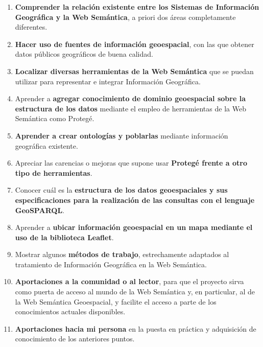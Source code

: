 \begin{enumerate}
	
	\item \textbf{Comprender la relación existente entre los Sistemas de Información Geográfica y la Web Semántica}, a priori dos áreas completamente diferentes.
	
	\item \textbf{Hacer uso de fuentes de información geoespacial}, con las que obtener datos públicos geográficos de buena calidad.
	
	\item \textbf{Localizar diversas herramientas de la Web Semántica} que se puedan utilizar para representar e integrar Información Geográfica.
	
	\item Aprender a \textbf{agregar conocimiento de dominio geoespacial sobre la estructura de los datos} mediante el empleo de herramientas de la Web Semántica como Protegé.
		
	\item \textbf{Aprender a crear ontologías y poblarlas}  mediante información geográfica existente.
	
	\item Apreciar las carencias o mejoras que supone usar \textbf{Protegé frente a otro tipo de herramientas}.
	
	\item Conocer cuál es la \textbf{estructura de los datos geoespaciales y sus especificaciones para la realización de las consultas con el lenguaje GeoSPARQL}.
	
	\item Aprender a \textbf{ubicar información geoespacial en un mapa mediante el uso de la biblioteca Leaflet}.
	
	\item Mostrar algunos \textbf{métodos de trabajo}, estrechamente adaptados al tratamiento de Información Geográfica en la Web Semántica.
	
	\item \textbf{Aportaciones a la comunidad o al lector}, para que el proyecto sirva como puerta de acceso al mundo de la Web Semántica y, en particular, al de la Web Semántica Geoespacial, y facilite el acceso a parte de los conocimientos actuales disponibles.
	
	\item \textbf{Aportaciones hacia mi persona} en la puesta en práctica y adquisición de conocimiento de los anteriores puntos.


\end{enumerate}
